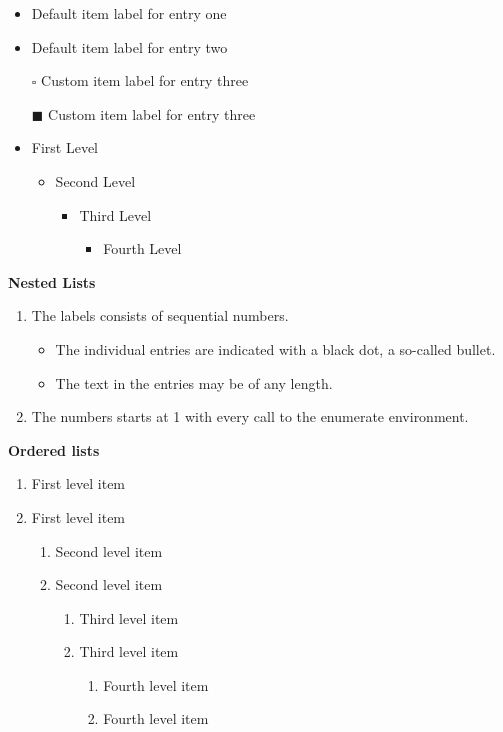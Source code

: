 \documentclass[12pt, letterpaper]{article}
\begin{document}
\begin{itemize}
	\item Default item label for entry one
	\item Default item label for entry two
	\item[$\square$] Custom item label for entry three
	\item[$\blacksquare$] Custom item label for entry three
\end{itemize}

\renewcommand{\labelitemi}{$\blacksquare$}	%
\renewcommand{\labelitemii}{$\square$}
\begin{itemize}
	\item First Level
	\begin{itemize}
		\item Second Level
		\begin{itemize}
			\item Third Level
			\begin{itemize}
				\item Fourth Level
			\end{itemize}
		\end{itemize}
	\end{itemize}
\end{itemize}

\textbf{Nested Lists}

\begin{enumerate}
	\item The labels consists of sequential numbers.
	\begin{itemize}
		\item The individual entries are indicated with a black dot, a so-called bullet.
		\item The text in the entries may be of any length.
	\end{itemize}
	\item The numbers starts at 1 with every call to the enumerate environment.
\end{enumerate}

\textbf{Ordered lists}

\begin{enumerate}
   \item First level item
   \item First level item
   \begin{enumerate}
     \item Second level item
     \item Second level item
     \begin{enumerate}
       \item Third level item
       \item Third level item
       \begin{enumerate}
         \item Fourth level item
         \item Fourth level item
       \end{enumerate}
     \end{enumerate}
   \end{enumerate}
 \end{enumerate}
\end{document}
